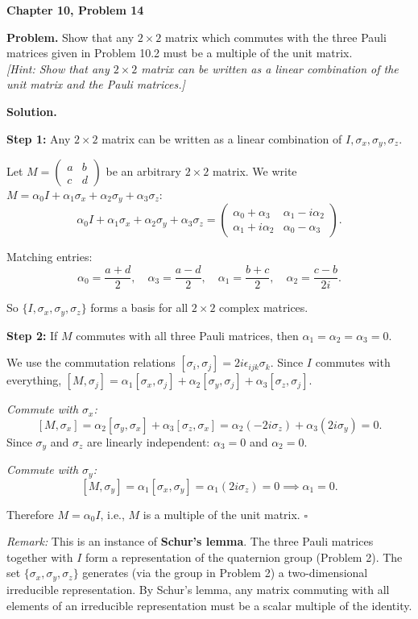 \documentclass[12pt]{article}
\begin{document}
\begin{center}
{\Large\bfseries Chapter 10, Problem 14}
\end{center}

\noindent\textbf{Problem.} Show that any $2 \times 2$ matrix which commutes with the three Pauli matrices given in Problem 10.2 must be a multiple of the unit matrix. \\[4pt]
\textit{[Hint: Show that any $2 \times 2$ matrix can be written as a linear combination of the unit matrix and the Pauli matrices.]}

\bigskip
\noindent\textbf{Solution.}

\noindent\textbf{Step 1:} Any $2 \times 2$ matrix can be written as a linear combination of $I, \sigma_x, \sigma_y, \sigma_z$.

Let $M = \begin{pmatrix} a & b \\ c & d \end{pmatrix}$ be an arbitrary $2 \times 2$ matrix. We write $M = \alpha_0 I + \alpha_1 \sigma_x + \alpha_2 \sigma_y + \alpha_3 \sigma_z$:
\[
\alpha_0 I + \alpha_1 \sigma_x + \alpha_2 \sigma_y + \alpha_3 \sigma_z =
\begin{pmatrix} \alpha_0 + \alpha_3 & \alpha_1 - i\alpha_2 \\ \alpha_1 + i\alpha_2 & \alpha_0 - \alpha_3 \end{pmatrix}.
\]

Matching entries:
\[
\alpha_0 = \frac{a+d}{2}, \quad \alpha_3 = \frac{a-d}{2}, \quad \alpha_1 = \frac{b+c}{2}, \quad \alpha_2 = \frac{c-b}{2i}.
\]

So $\{I, \sigma_x, \sigma_y, \sigma_z\}$ forms a basis for all $2\times 2$ complex matrices.

\medskip
\noindent\textbf{Step 2:} If $M$ commutes with all three Pauli matrices, then $\alpha_1 = \alpha_2 = \alpha_3 = 0$.

We use the commutation relations $[\sigma_i, \sigma_j] = 2i\epsilon_{ijk}\sigma_k$. Since $I$ commutes with everything, $[M, \sigma_j] = \alpha_1[\sigma_x, \sigma_j] + \alpha_2[\sigma_y, \sigma_j] + \alpha_3[\sigma_z, \sigma_j]$.

\textit{Commute with $\sigma_x$:}
\[
[M, \sigma_x] = \alpha_2[\sigma_y, \sigma_x] + \alpha_3[\sigma_z, \sigma_x] = \alpha_2(-2i\sigma_z) + \alpha_3(2i\sigma_y) = 0.
\]
Since $\sigma_y$ and $\sigma_z$ are linearly independent: $\alpha_3 = 0$ and $\alpha_2 = 0$.

\textit{Commute with $\sigma_y$:}
\[
[M, \sigma_y] = \alpha_1[\sigma_x, \sigma_y] = \alpha_1(2i\sigma_z) = 0 \implies \alpha_1 = 0.
\]

Therefore $M = \alpha_0 I$, i.e., $M$ is a multiple of the unit matrix. $\square$

\medskip
\noindent\textit{Remark:} This is an instance of \textbf{Schur's lemma}. The three Pauli matrices together with $I$ form a representation of the quaternion group (Problem 2). The set $\{\sigma_x, \sigma_y, \sigma_z\}$ generates (via the group in Problem 2) a two-dimensional irreducible representation. By Schur's lemma, any matrix commuting with all elements of an irreducible representation must be a scalar multiple of the identity.
\end{document}
